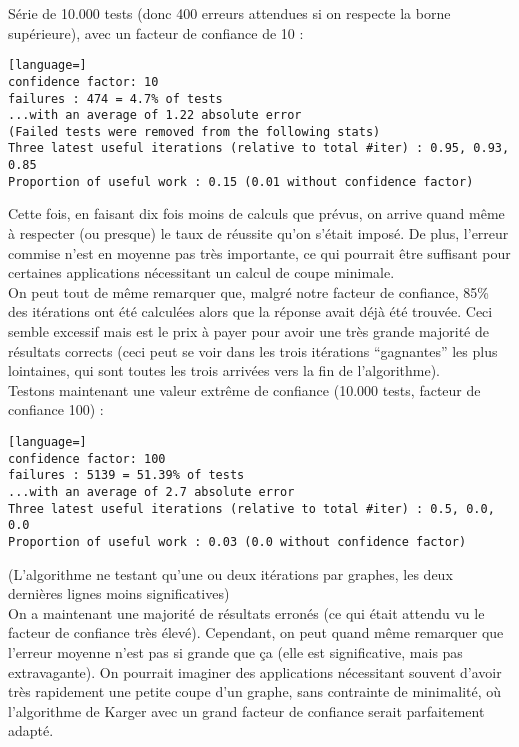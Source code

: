 \documentclass[a4paper,10pt]{article}
\begin{document}
Série de 10.000 tests (donc 400 erreurs attendues si on respecte la borne supérieure), avec un facteur de confiance de 10 :
\begin{lstlisting}[language=]
confidence factor: 10
failures : 474 = 4.7% of tests
...with an average of 1.22 absolute error
(Failed tests were removed from the following stats)
Three latest useful iterations (relative to total #iter) : 0.95, 0.93, 0.85
Proportion of useful work : 0.15 (0.01 without confidence factor)
\end{lstlisting}
\fontfamily{}

Cette fois, en faisant dix fois moins de calculs que prévus, on arrive quand même à respecter (ou presque) le taux de réussite qu'on s'était imposé. De plus, l'erreur commise n'est en moyenne pas très importante, ce qui pourrait être suffisant pour certaines applications nécessitant un calcul de coupe minimale.\\

On peut tout de même remarquer que, malgré notre facteur de confiance, 85\% des itérations ont été calculées alors que la réponse avait déjà été trouvée. Ceci semble excessif mais est le prix à payer pour avoir une très grande majorité de résultats corrects (ceci peut se voir dans les trois itérations ``gagnantes'' les plus lointaines, qui sont toutes les trois arrivées vers la fin de l'algorithme).\\

Testons maintenant une valeur extrême de confiance (10.000 tests, facteur de confiance 100) :
\begin{lstlisting}[language=]
confidence factor: 100
failures : 5139 = 51.39% of tests
...with an average of 2.7 absolute error
Three latest useful iterations (relative to total #iter) : 0.5, 0.0, 0.0
Proportion of useful work : 0.03 (0.0 without confidence factor)
\end{lstlisting}
\fontfamily{}
(L'algorithme ne testant qu'une ou deux itérations par graphes, les deux dernières lignes moins significatives)\\

On a maintenant une majorité de résultats erronés (ce qui était attendu vu le facteur de confiance très élevé). Cependant, on peut quand même remarquer que l'erreur moyenne n'est pas si grande que ça (elle est significative, mais pas extravagante). On pourrait imaginer des applications nécessitant souvent d'avoir très rapidement une petite coupe d'un graphe, sans contrainte de minimalité, où l'algorithme de Karger avec un grand facteur de confiance serait parfaitement adapté.
\end{document}
